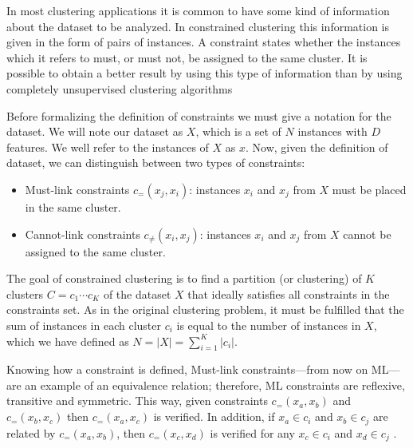 \documentclass[review]{elsarticle}
\begin{document}

In most clustering applications it is common to have some kind of information about the dataset to be analyzed. In constrained clustering this information is given in the form of pairs of instances. A constraint states whether the instances which it refers to must, or must not, be assigned to the same cluster. It is possible to obtain a better result by using this type of information than by using completely unsupervised clustering algorithms

Before formalizing the definition of constraints we must give a notation for the dataset. We will note our dataset as $X$, which is a set of $N$ instances with $D$ features. We well refer to the instances of $X$ as $x$. Now, given the definition of dataset, we can distinguish between two types of constraints:

\begin{itemize}

	\item Must-link constraints $c_=(x_j,x_i)$: instances $x_i$ and $x_j$ from $X$ must be placed in the same cluster.

	\item Cannot-link constraints $c_{\neq}(x_i,x_j)$: instances $x_i$ and $x_j$ from $X$ cannot be assigned to the same cluster.

\end{itemize}

The goal of constrained clustering is to find a partition (or clustering) of $K$ clusters $C = {c_1 \cdots c_K}$ of the dataset $X$ that ideally satisfies all constraints in the constraints set. As in the original clustering problem, it must be fulfilled that the sum of instances in each cluster $c_i$ is equal to the number of instances in $X$, which we have defined as $N = |X| = \sum_{i = 1}^{K} |c_i|$.

Knowing how a constraint is defined, Must-link constraints---from now on ML---are an example of an equivalence relation; therefore, ML constraints are reflexive, transitive and symmetric. This way, given constraints $c_=(x_a,x_b)$ and $c_=(x_b,x_c)$ then $c_=(x_a,x_c)$ is verified. In addition, if $x_a \in c_i$ and $x_b \in c_j$ are related by $c_=(x_a,x_b)$, then $c_=(x_c,x_d)$ is verified for any $x_c \in c_i$ and $x_d \in c_j$ \cite{xu2013improving}\cite{davidson2007survey}.
\end{document}
